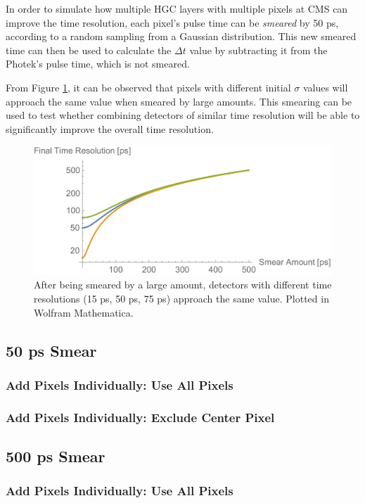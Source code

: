 \documentclass[12pt]{article}
\begin{document}
In order to simulate how multiple HGC layers with multiple pixels at CMS can improve the time resolution, each pixel's pulse time can be \textit{smeared} by 50 ps, according to a random sampling from a Gaussian distribution.
This new smeared time can then be used to calculate the $\Delta t$ value by subtracting it from the Photek's pulse time, which is not smeared.

From Figure \ref{fig:mathematica_plot}, it can be observed that pixels with different initial $\sigma$ values will approach the same value when smeared by large amounts. 
This smearing can be used to test whether combining detectors of similar time resolution will be able to significantly improve the overall time resolution.

\begin{figure}[h]
	\centering
	\includegraphics[width=.75\textwidth]{mathematica_plot.pdf}
	\caption{After being smeared by a large amount, detectors with different time resolutions (15 ps, 50 ps, 75 ps) approach the same value. Plotted in Wolfram Mathematica.}
	\label{fig:mathematica_plot}
\end{figure}

\subsection{50 ps Smear}
\subsubsection{Add Pixels Individually: Use All Pixels}


\subsubsection{Add Pixels Individually: Exclude Center Pixel}


\subsection{500 ps Smear}
\subsubsection{Add Pixels Individually: Use All Pixels}
\end{document}
